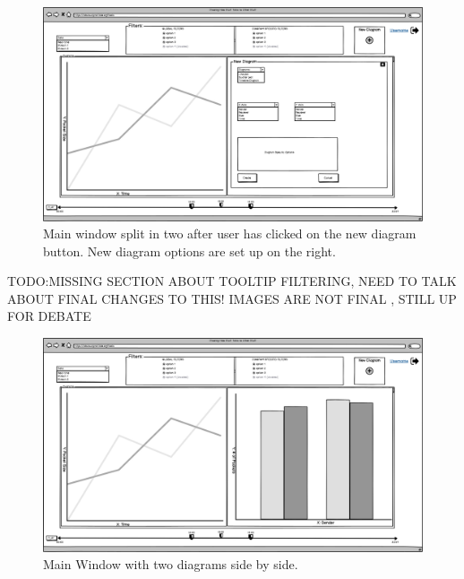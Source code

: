 \documentclass[twoside, english, draft]{Pflichtenheft}
\begin{document}
\vfill

\begin{figure}[h]
\centering
\includegraphics[width=\textwidth]{Images/03MW.png}
	\caption{Main window split in two after user has clicked on the new diagram button. New diagram options are set up on the right.}
	\label{fig:mainWindow1}
\end{figure}


\vfill
\clearpage

TODO:MISSING SECTION ABOUT TOOLTIP FILTERING, NEED TO TALK ABOUT FINAL CHANGES TO THIS!
IMAGES ARE NOT FINAL , STILL UP FOR DEBATE

\begin{figure}[h]
\centering
\label{fig:mainWindow2}
\includegraphics[width=\textwidth]{Images/04MW.png}
	\caption{Main Window with two diagrams side by side.}
		\label{fig:mainWindow2}
\end{figure}
\end{document}
